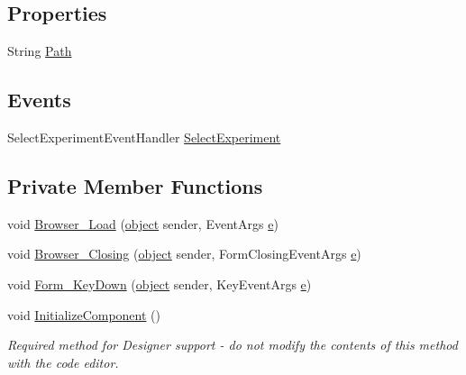 \subsection*{Properties}
\begin{DoxyCompactItemize}
\item 
String \hyperlink{class_web_analyzer_1_1_u_i_1_1_select_experiment_form_ad5b8d4def72474dd55f8d244955bae36}{Path}
\end{DoxyCompactItemize}
\subsection*{Events}
\begin{DoxyCompactItemize}
\item 
Select\+Experiment\+Event\+Handler \hyperlink{class_web_analyzer_1_1_u_i_1_1_select_experiment_form_a1e364e5b7061777bab04e7b255eff656}{Select\+Experiment}
\end{DoxyCompactItemize}
\subsection*{Private Member Functions}
\begin{DoxyCompactItemize}
\item 
void \hyperlink{class_web_analyzer_1_1_u_i_1_1_select_experiment_form_ab4c7e86807a07684642f75d09abfd3a1}{Browser\+\_\+\+Load} (\hyperlink{_u_i_2_h_t_m_l_resources_2js_2lib_2underscore_8min_8js_aae18b7515bb2bc4137586506e7c0c903}{object} sender, Event\+Args \hyperlink{_u_i_2_h_t_m_l_resources_2js_2lib_2bootstrap_8min_8js_ab5902775854a8b8440bcd25e0fe1c120}{e})
\item 
void \hyperlink{class_web_analyzer_1_1_u_i_1_1_select_experiment_form_aab5ce73c7eb98e21d0ff540ee47c4745}{Browser\+\_\+\+Closing} (\hyperlink{_u_i_2_h_t_m_l_resources_2js_2lib_2underscore_8min_8js_aae18b7515bb2bc4137586506e7c0c903}{object} sender, Form\+Closing\+Event\+Args \hyperlink{_u_i_2_h_t_m_l_resources_2js_2lib_2bootstrap_8min_8js_ab5902775854a8b8440bcd25e0fe1c120}{e})
\item 
void \hyperlink{class_web_analyzer_1_1_u_i_1_1_select_experiment_form_a3078657fb719032c67650f7fd950d161}{Form\+\_\+\+Key\+Down} (\hyperlink{_u_i_2_h_t_m_l_resources_2js_2lib_2underscore_8min_8js_aae18b7515bb2bc4137586506e7c0c903}{object} sender, Key\+Event\+Args \hyperlink{_u_i_2_h_t_m_l_resources_2js_2lib_2bootstrap_8min_8js_ab5902775854a8b8440bcd25e0fe1c120}{e})
\item 
void \hyperlink{class_web_analyzer_1_1_u_i_1_1_select_experiment_form_ac29ac91403371dfaa7ec50782f4d4f2f}{Initialize\+Component} ()
\begin{DoxyCompactList}\small\item\em Required method for Designer support -\/ do not modify the contents of this method with the code editor. \end{DoxyCompactList}\end{DoxyCompactItemize}
